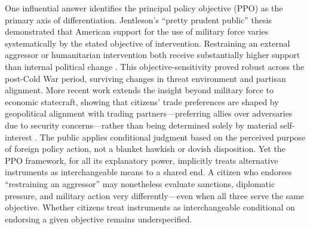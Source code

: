 \documentclass[12pt,letterpaper]{article}
\begin{document}
One influential answer identifies the principal policy objective (PPO) as the primary axis of differentiation. Jentleson's ``pretty prudent public'' thesis demonstrated that American support for the use of military force varies systematically by the stated objective of intervention. Restraining an external aggressor or humanitarian intervention both receive substantially higher support than internal political change \citep{jentleson_pretty_1992, jentleson_still_1998}. This objective-sensitivity proved robust across the post-Cold War period, surviving changes in threat environment and partisan alignment. More recent work extends the insight beyond military force to economic statecraft, showing that citizens' trade preferences are shaped by geopolitical alignment with trading partners---preferring allies over adversaries due to security concerns---rather than being determined solely by material self-interest \citep{carnegie_public_2022}. The public applies conditional judgment based on the perceived purpose of foreign policy action, not a blanket hawkish or dovish disposition. Yet the PPO framework, for all its explanatory power, implicitly treats alternative instruments as interchangeable means to a shared end. A citizen who endorses ``restraining an aggressor'' may nonetheless evaluate sanctions, diplomatic pressure, and military action very differently---even when all three serve the same objective. Whether citizens treat instruments as interchangeable conditional on endorsing a given objective remains underspecified.
\end{document}
